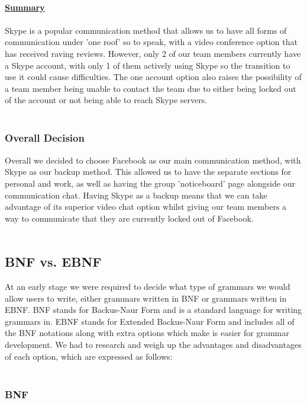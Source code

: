 \documentclass{l3proj}
\begin{document}
\\
\textbf {\underline{Summary}}\\
\\
Skype is a popular communication method that allows us to have all forms of communication under 'one roof' so to speak, with a video conference option that has received raving reviews. However, only 2 of our team members currently have a Skype account, with only 1 of them actively using Skype so the transition to use it could cause difficulties. The one account option also raises the possibility of a team member being unable to contact the team due to either being locked out of the account or not being able to reach Skype servers.\\
\\
\subsubsection{Overall Decision}
Overall we decided to choose Facebook as our main communication method, with Skype as our backup method. This allowed us to have the separate sections for personal and work, as well as having the group 'noticeboard' page alongside our communication chat. Having Skype as a backup means that we can take advantage of its superior video chat option whilst giving our team members a way to communicate that they are currently locked out of Facebook. \\
\\

\subsection{BNF vs. EBNF}
At an early stage we were required to decide what type of grammars we would allow users to write, either grammars written in BNF or grammars written in EBNF. BNF stands for Backus-Naur Form and is a standard language for writing grammars in. EBNF stands for Extended Backus-Naur Form and includes all of the BNF notations along with extra options which make is easier for grammar development. We had to research and weigh up the advantages and disadvantages of each option, which are expressed as follows:\\
\\
\subsubsection{BNF}
\end{document}
